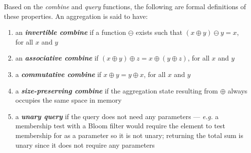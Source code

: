 Based on the \textit{combine} and \textit{query} functions, the following are formal definitions of these properties. An aggregation is said to have:

\begin{enumerate}
    \item  an \textbf{\textit{invertible combine}} if a function $\ominus$ exists such that $(x \oplus y) \ominus y = x$, for all $x$ and $y$
    
    \item  an \textbf{\textit{associative combine}} if $(x \oplus y) \oplus z = x \oplus (y \oplus z)$, for all $x$ and $y$
    
    \item  a \textbf{\textit{commutative combine}} if $x \oplus y = y \oplus x$, for all $x$ and $y$
    
    \item  a \textbf{\textit{size-preserving combine}} if the aggregation state resulting from $\oplus$ always occupies the same space in memory
   
    \item  a \textbf{\textit{unary query}} if the query does not need any parameters --- \textit{e.g.} a membership test with a Bloom filter would require the element to test membership for as a parameter so it is not unary; returning the total sum is unary since it does not require any parameters
\end{enumerate}

